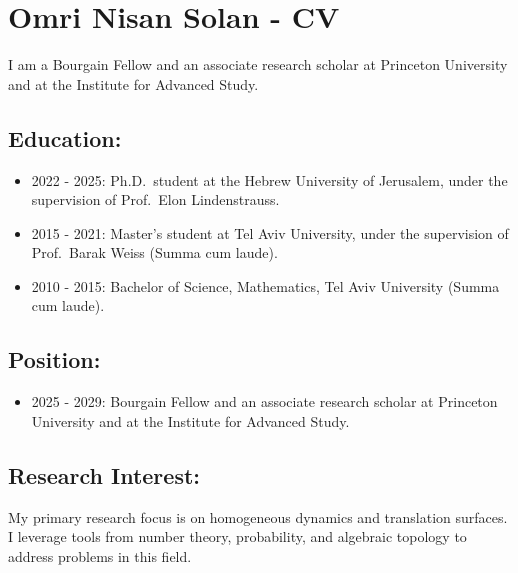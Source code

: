 \hypertarget{omri-nisan-solan---cv}{%
\section{\texorpdfstring{\textbf{Omri Nisan Solan -
CV}}{Omri Nisan Solan - CV}}\label{omri-nisan-solan---cv}}

I am a Bourgain Fellow and an associate research scholar at Princeton
University and at the Institute for Advanced Study.

\hypertarget{education}{%
\subsection{\texorpdfstring{\textbf{Education:}}{Education:}}\label{education}}

\begin{itemize}
\tightlist
  \item
  2022 - 2025: Ph.D.~student at the Hebrew University of Jerusalem,
  under the supervision of Prof.~Elon Lindenstrauss.
  \item
  2015 - 2021: Master's student at Tel Aviv University, under the
  supervision of Prof.~Barak Weiss (Summa cum laude).
  \item
  2010 - 2015: Bachelor of Science, Mathematics, Tel Aviv University
  (Summa cum laude).
\end{itemize}
\hypertarget{Position}{%
\subsection{\texorpdfstring{\textbf{Position:}}{Position:}}\label{position}}

\begin{itemize}
\tightlist
\item
  2025 - 2029: Bourgain Fellow and an associate research scholar at
  Princeton University and at the Institute for Advanced Study.
\end{itemize}

\hypertarget{research-interest}{%
\subsection{\texorpdfstring{\textbf{Research
Interest:}}{Research Interest:}}\label{research-interest}}

My primary research focus is on homogeneous dynamics and translation surfaces. I leverage tools
from number theory, probability, and algebraic topology to address
problems in this field.

